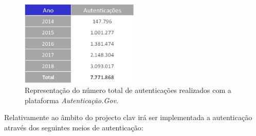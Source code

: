 \begin{figure}[h]
    \centering
    \includegraphics[width=0.5\textwidth]{img/authgov/authAnos.png}
    \caption{Representação do número total de autenticações realizados com a plataforma \emph{Autenticação.Gov}.\cite{authGovStats}}
\end{figure}


Relativamente ao âmbito do projecto \gls{clav} irá ser implementada a autenticação através dos seguintes meios de autenticação:

